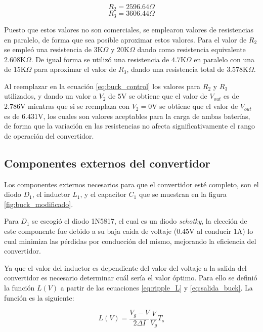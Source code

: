    $$R_2 = 2596.64\Omega$$ 
    $$R_3 = 3606.44\Omega$$

    Puesto que estos valores no son comerciales, se emplearon valores de resistencias en 
    paralelo, de forma que sea posible aproximar estos valores. Para el valor de $R_2$ 
    se empleó una resistencia de $3\text{K}\Omega$ y $20\text{K}\Omega$ dando como 
    resistencia equivalente $2.608\text{K}\Omega$. De igual forma se utilizó una 
    resistencia de $4.7\text{K}\Omega$ en paralelo con una de $15\text{K}\Omega$ para aproximar
    el valor de $R_3$, dando una resistencia total de $3.578\text{K}\Omega$.

    Al reemplazar en la ecuación \ref{eq:buck_control} los valores para $R_2$ y $R_3$ utilizados, 
    y dando un valor a $V_2$ de $5\text{V}$ se obtiene que el valor de $V_{out}$ es de $2.786\text{V}$
    mientras que si se reemplaza con $V_2 = 0\text{V}$ se obtiene que el valor de $V_{out}$ es de
    $6.431\text{V}$, los cuales son valores aceptables para la carga de ambas baterías,
    de forma que la variación en las resistencias no afecta significativamente
    el rango de operación del convertidor.

    \subsection{Componentes externos del convertidor}

        Los componentes externos necesarios para que el convertidor esté completo, son el 
        diodo $D_1$, el inductor $L_1$, y el capacitor $C_1$ que se muestran en la figura
        \ref{fig:buck_modificado}.

        Para $D_1$ se escogió el diodo 1N5817, el cual es un diodo \textit{
        schotky}, la elección de este componente fue debido a su baja caída de voltaje
        ($0.45\text{V}$ al conducir $1\text{A}$) lo cual minimiza las pérdidas por 
        conducción del mismo, mejorando la eficiencia del convertidor.

        Ya que el valor del inductor es dependiente
        del valor del voltaje a la salida del convertidor es necesario determinar cuál
        sería el valor óptimo. Para ello se definió la función $L(V)$ a partir de las 
        ecuaciones \ref{eq:ripple_L} y \ref{eq:salida_buck}. La función es la siguiente: 

        \begin{equation}
            L(V) = \frac{V_g - V}{2\Delta I}\frac{V}{V_g} T_s
            \label{eq:L_function}
        \end{equation}

